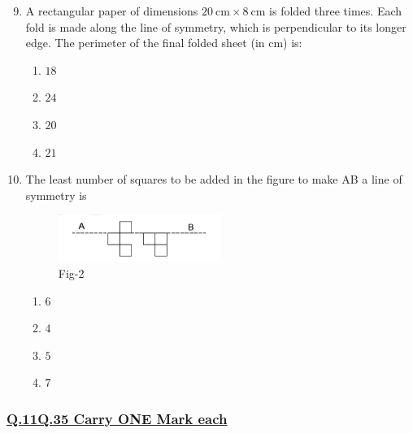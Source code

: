 \documentclass[journal]{IEEEtran}
\theoremstyle{remark}
\begin{document}
\begin{enumerate}[itemsep=1em]
\setcounter{enumi}{8}
\item A rectangular paper of dimensions $20\ \text{cm} \times 8\ \text{cm}$ is folded three times. Each fold is made along the line of symmetry, which is perpendicular to its longer edge. 
The perimeter of the final folded sheet (in cm) is:
\begin{multicols}{4}
\begin{enumerate}
       \item $18$
       \item $24$
       \item $20$
       \item $21$

\end{enumerate}
\end{multicols}
\end{enumerate}

\newpage
\vspace*{0.25cm}

\begin{enumerate}[itemsep=1em]
\setcounter{enumi}{9}
\item The least number of squares to be added in the figure to make AB a line of symmetry is
\begin{figure}[H]
    \centering
    \includegraphics[width=0.5\textwidth]{figs/fig-2.jpeg}
    \caption*{Fig-2}
    \label{fig-2}
\end{figure}
\begin{multicols}{4}
\begin{enumerate}
           \item $6$
           \item $4$
           \item $5$
           \item $7$

\end{enumerate}
\end{multicols}
\end{enumerate}



\subsubsection{\underline{Q.11\text{-}Q.35 Carry ONE Mark each}}
\end{document}

